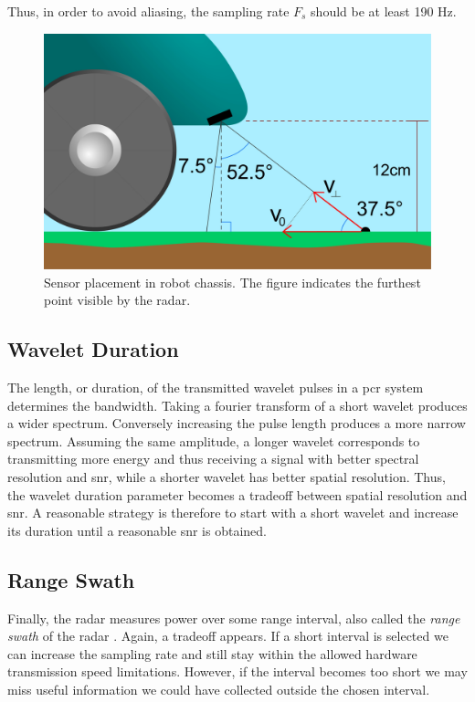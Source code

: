 Thus, in order to avoid aliasing, the sampling rate $F_s$ should be at least 190 Hz. 


\begin{figure}[h]
	\centering
	\includegraphics[scale=0.30]{figs_temp/sensor_placement.jpg}
	\caption{Sensor placement in robot chassis. The figure indicates the furthest point visible by the radar.}
	\label{fig:sensor_placement}
\end{figure}
\subsection{Wavelet Duration}


The length, or duration, of the transmitted wavelet pulses in a \gls{pcr} system determines the bandwidth. Taking a fourier transform of a short wavelet produces a wider spectrum. Conversely increasing the pulse length produces a more narrow spectrum. Assuming the same amplitude, a longer wavelet corresponds to transmitting more energy and thus receiving a signal with better spectral resolution and \gls{snr}, while a shorter wavelet has better spatial resolution. Thus, the wavelet duration parameter becomes a tradeoff between spatial resolution and \gls{snr}. A reasonable strategy is therefore to start with a short wavelet and increase its duration until a reasonable \gls{snr} is obtained.  

\subsection{Range Swath}

Finally, the radar measures power over some range interval, also called the \emph{range swath} of the radar \citep{richards_2014}. Again, a tradeoff appears. If a short interval is selected we can increase the sampling rate and still stay within the allowed hardware transmission speed limitations. However, if the interval becomes too short we may miss useful information we could have collected outside the chosen interval. 

